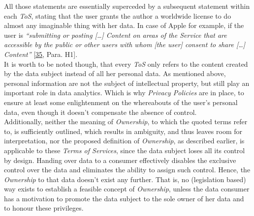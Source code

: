 \documentclass[12pt,english,a4paper,titlepage,cleardoublepage=empty,dottedtoc]{report}
\begin{document}
All those statements are essentially superceded by a subsequent
statement within each \emph{ToS}, stating that the user grants the
author a worldwide license to do almost any imaginable thing with her
data. In case of Apple for example, if the user is \emph{``submitting or
posting {[}\ldots{}{]} Content on areas of the Service that are
accessible by the public or other users with whom {[}the user{]} consent
to share {[}\ldots{}{]} Content''}
{[}\protect\hyperlink{ref-web_2016_apple-icloud_terms-of-service}{35},
Para. H1{]}.\\
It is worth to be noted though, that every \emph{ToS} only refers to the
content created by the data subject instead of all her personal data. As
mentioned above, personal information are not the subject of
intellectual property, but still play an important role in data
analytics. Which is why \emph{Privacy Policies} are in place, to ensure
at least some enlightenment on the whereabouts of the user's personal
data, even though it doesn't compensate the absence of control.\\
Additionally, neither the meaning of \emph{Ownership}, to which the
quoted terms refer to, is sufficiently outlined, which results in
ambiguity, and thus leaves room for interpretation, nor the proposed
definition of \emph{Ownership},
\protect\hypertarget{def--ownership}{}{as described earlier}, is
applicable to these \emph{Terms of Services}, since the data subject
loses all its control by design. Handing over data to a consumer
effectively disables the exclusive control over the data and eliminates
the ability to assign such control. Hence, the \emph{Ownership} to that
data doesn't exist any further. That is, no (legislation based) way
exists to establish a feasible concept of \emph{Ownership}, unless the
data consumer has a motivation to promote the data subject to the sole
owner of her data and to honour these privileges.
\end{document}

